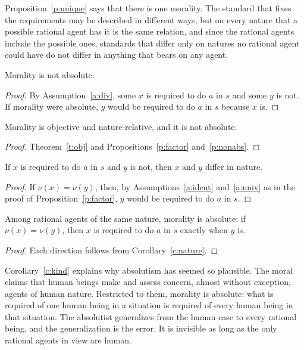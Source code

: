 \documentclass{situationist-preprint}
\begin{document}
Proposition~\ref{p:unique} says that there is one morality. The standard that fixes the requirements may be described in different ways, but on every nature that a possible rational agent has it is the same relation, and since the rational agents include the possible ones, standards that differ only on natures no rational agent could have do not differ in anything that bears on any agent.

\begin{proposition}\label{p:nonabs}
Morality is not absolute.
\end{proposition}

\begin{proof}
By Assumption~\ref{a:div}, some $x$ is required to do $a$ in $s$ and some $y$ is not. If morality were absolute, $y$ would be required to do $a$ in $s$ because $x$ is.
\end{proof}

\begin{theorem}\label{t:main}
Morality is objective and nature-relative, and it is not absolute.
\end{theorem}

\begin{proof}
Theorem~\ref{t:obj} and Propositions~\ref{p:factor} and~\ref{p:nonabs}.
\end{proof}

\begin{corollary}\label{c:nature}
If $x$ is required to do $a$ in $s$ and $y$ is not, then $x$ and $y$ differ in nature.
\end{corollary}

\begin{proof}
If $\nu(x) = \nu(y)$, then, by Assumptions~\ref{a:ident} and~\ref{a:univ} as in the proof of Proposition~\ref{p:factor}, $y$ would be required to do $a$ in $s$.
\end{proof}

\begin{corollary}\label{c:kind}
Among rational agents of the same nature, morality is absolute: if $\nu(x) = \nu(y)$, then $x$ is required to do $a$ in $s$ exactly when $y$ is.
\end{corollary}

\begin{proof}
Each direction follows from Corollary~\ref{c:nature}.
\end{proof}

Corollary~\ref{c:kind} explains why absolutism has seemed so plausible. The moral claims that human beings make and assess concern, almost without exception, agents of human nature. Restricted to them, morality is absolute: what is required of one human being in a situation is required of every human being in that situation. The absolutist generalizes from the human case to every rational being, and the generalization is the error. It is invisible as long as the only rational agents in view are human.
\end{document}
